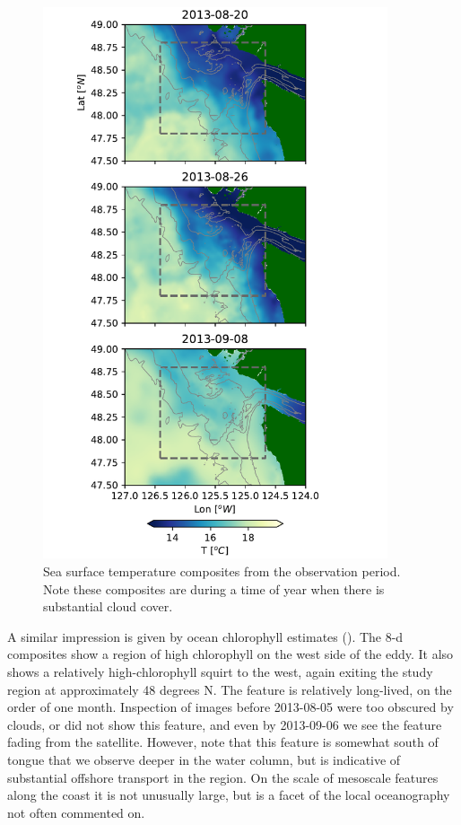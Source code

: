 \documentclass[draft]{agujournal2019}
\begin{document}
\begin{figure}
  \begin{center}
    \includegraphics[width=4in]{SST}
    \caption{Sea surface temperature composites \cite{GHRSST, ChinEtAl17} from the observation period.  Note these composites are during a time of year when there is substantial cloud cover.\label{fig:SST}}
  \end{center}
\end{figure}

A similar impression is given by ocean chlorophyll estimates ().  The 8-d composites show a region of high chlorophyll  on the west side of the eddy. It also shows a relatively  high-chlorophyll squirt to the west, again exiting the study region at approximately 48 degrees N.  The feature is relatively long-lived, on the order of one month.  Inspection of images before 2013-08-05 were too obscured by clouds, or did not show this feature, and even by 2013-09-06 we see the feature fading from the satellite.  However, note that this feature is somewhat south of tongue that we observe deeper in the water column, but is indicative of substantial offshore transport in the region.  On the scale of mesoscale features along the coast it is not unusually large, but is a facet of the local oceanography not often commented on.
\end{document}
